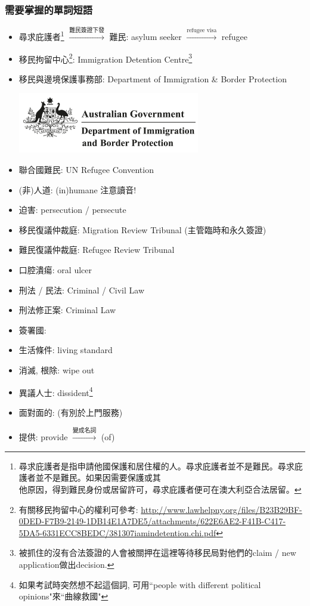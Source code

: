 \subsubsection*{需要掌握的單詞短語}
\begin{multicols}{2}
\begin{itemize}
  \itemsep0em
  \item 尋求庇護者\footnote{尋求庇護者是指申請他國保護和居住權的人。尋求庇護者並不是難民。尋求庇護者並不是難民。如果因需要保護或其\\他原因，得到難民身份或居留許可，尋求庇護者便可在澳大利亞合法居留。} $\xrightarrow{\text{難民簽證下發}}$ 難民: asylum seeker $\xrightarrow{\text{refugee visa}}$ refugee
  \item 移民拘留中心\footnote{有關移民拘留中心的權利可參考: \url{http://www.lawhelpny.org/files/B23B29BF-0DED-F7B9-2149-1DB14E1A7DE5/attachments/622E6AE2-F41B-C417-5DA5-6331ECC8BEDC/381307iamindetention.chi.pdf}}: Immigration Detention Centre\footnote{被抓住的沒有合法簽證的人會被關押在這裡等待移民局對他們的claim / new application做出decision.}
  \item 移民與邊境保護事務部: Department of Immigration \& Border Protection
  \begin{center}
    \includegraphics[scale=.6]{pics/dibp-logo}
  \end{center}
  \item 聯合國難民: UN Refugee Convention
  \item (非)人道: (in)humane 注意讀音!
  \item 迫害: persecution / persecute
  \item 移民復議仲裁庭: Migration Review Tribunal (主管臨時和永久簽證)
  \item 難民復議仲裁庭: Refugee Review Tribunal
  \item 口腔潰瘍: oral ulcer
  \item 刑法 / 民法: Criminal / Civil Law
  \item 刑法修正案: Criminal Law 
  \item 簽署國: 
  \item 生活條件: living standard
  \item 消滅, 根除: wipe out
  \item 異議人士: dissident\footnote{如果考試時突然想不起這個詞, 可用``people with different political opinions"來``曲線救國"}
  \item 面對面的:  (有別於上門服務)
  \item 提供: provide $\xrightarrow{\text{變成名詞}}$  (of)
\end{itemize}
\end{multicols}

